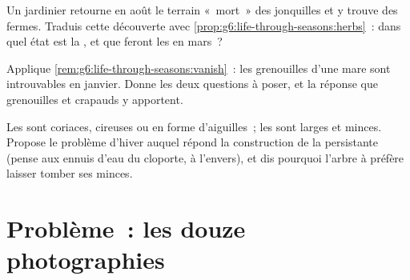 \begin{exercise}[$\star\star$]\label{exo:g6:life-through-seasons:10}
Un jardinier retourne en août le terrain «~mort~» des jonquilles et
y trouve des  fermes. Traduis cette découverte avec
\cref{prop:g6:life-through-seasons:herbs}~: dans quel état est la
, et que feront les  en mars~?
\end{exercise}

\begin{exercise}[$\star\star$]\label{exo:g6:life-through-seasons:11}
Applique \cref{rem:g6:life-through-seasons:vanish}~: les grenouilles
d'une mare sont introuvables en janvier. Donne les deux questions à
poser, et la réponse que grenouilles et crapauds y apportent.
\end{exercise}

\begin{exercise}[$\star\star\star$]\label{exo:g6:life-through-seasons:12}
Les   sont coriaces, cireuses ou en forme
d'aiguilles~; les   sont larges et minces. Propose
le problème d'hiver auquel répond la construction de la 
persistante (pense aux ennuis d'eau du cloporte, à l'envers), et
dis pourquoi l'arbre à   préfère laisser tomber ses
 minces.
\end{exercise}

\section{Problème~: les douze photographies}

